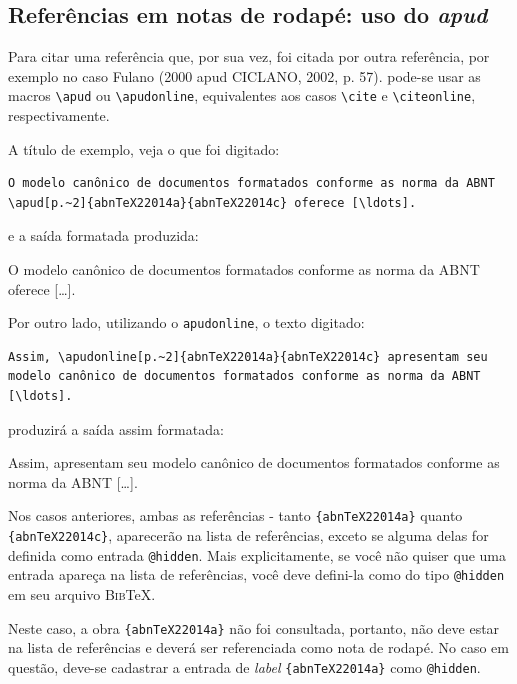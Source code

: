 \begin{apendicesenv}
\subsection{Referências em notas de rodapé: uso do \textit{apud}}
\label{subsec:refRodape}


Para citar uma referência que, por sua vez, foi citada por outra referência, por exemplo no caso Fulano (2000 apud CICLANO, 2002, p. 57). pode-se usar as macros \verb|\apud| ou \verb|\apudonline|, equivalentes aos casos \verb|\cite| e \verb|\citeonline|, respectivamente.

A título de exemplo, veja o que foi digitado:

\begin{verbatim}
O modelo canônico de documentos formatados conforme as norma da ABNT
\apud[p.~2]{abnTeX22014a}{abnTeX22014c} oferece [\ldots].
\end{verbatim}

e a saída formatada produzida:

O modelo canônico de documentos formatados conforme as norma da ABNT  oferece [\ldots].

Por outro lado, utilizando o \verb|apudonline|, o texto digitado:

\begin{verbatim}
Assim, \apudonline[p.~2]{abnTeX22014a}{abnTeX22014c} apresentam seu
modelo canônico de documentos formatados conforme as norma da ABNT [\ldots].
\end{verbatim}

produzirá a saída assim formatada:

Assim,  apresentam seu modelo canônico de documentos formatados conforme as norma da ABNT [\ldots].


Nos casos anteriores, ambas as referências - tanto \verb|{abnTeX22014a}| quanto \verb|{abnTeX22014c}|, aparecerão na lista de referências, exceto se alguma delas for definida como entrada \texttt{@hidden}. Mais explicitamente, se você não quiser que uma entrada apareça na lista de referências, você deve defini-la como do tipo \texttt{@hidden} em seu arquivo \textsc{Bib}\TeX{}.

Neste caso, a obra \verb|{abnTeX22014a}| não foi consultada, portanto, não deve estar na lista de referências e deverá ser referenciada como nota de rodapé. No caso em questão, deve-se cadastrar a entrada de \textit{label} \verb|{abnTeX22014a}| como \texttt{@hidden}.


\end{apendicesenv}
